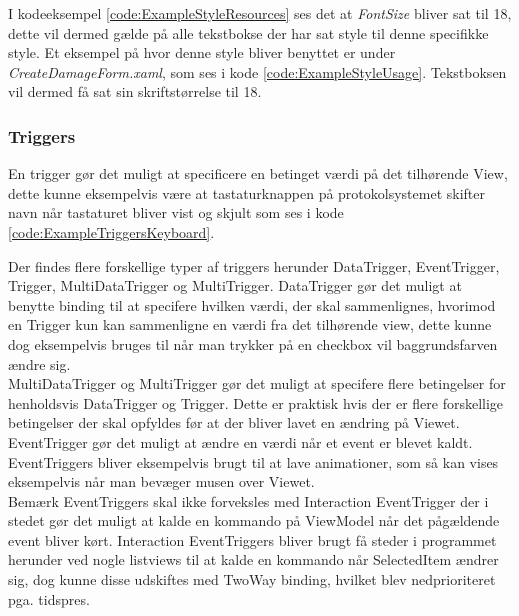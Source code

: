 
I kodeeksempel \ref{code:ExampleStyleResources} ses det at \textit{FontSize} bliver sat til 18, dette vil dermed gælde på alle tekstbokse der har sat style til denne specifikke style. Et eksempel på hvor denne style bliver benyttet er under \textit{CreateDamageForm.xaml}, som ses i kode \ref{code:ExampleStyleUsage}. Tekstboksen vil dermed få sat sin skriftstørrelse til 18.


\subsubsection*{Triggers}
En trigger gør det muligt at specificere en betinget værdi på det tilhørende View, dette kunne eksempelvis være at tastaturknappen på protokolsystemet skifter navn når tastaturet bliver vist og skjult som ses i kode \ref{code:ExampleTriggersKeyboard}.\\


Der findes flere forskellige typer af triggers herunder DataTrigger, EventTrigger, Trigger, MultiDataTrigger og MultiTrigger. DataTrigger gør det muligt at benytte binding til at specifere hvilken værdi, der skal sammenlignes, hvorimod en Trigger kun kan sammenligne en værdi fra det tilhørende view, dette kunne dog eksempelvis bruges til når man trykker på en checkbox vil baggrundsfarven ændre sig.\\

MultiDataTrigger og MultiTrigger gør det muligt at specifere flere betingelser for henholdsvis DataTrigger og Trigger. Dette er praktisk hvis der er flere forskellige betingelser der skal opfyldes før at der bliver lavet en ændring på Viewet.\\

EventTrigger gør det muligt at ændre en værdi når et event er blevet kaldt. EventTriggers bliver eksempelvis brugt til at lave animationer, som så kan vises eksempelvis når man bevæger musen over Viewet.\\

Bemærk EventTriggers skal ikke forveksles med Interaction EventTrigger der i stedet gør det muligt at kalde en kommando på ViewModel når det pågældende event bliver kørt. Interaction EventTriggers bliver brugt få steder i programmet herunder ved nogle listviews til at kalde en kommando når SelectedItem ændrer sig, dog kunne disse udskiftes med TwoWay binding, hvilket blev nedprioriteret pga. tidspres.